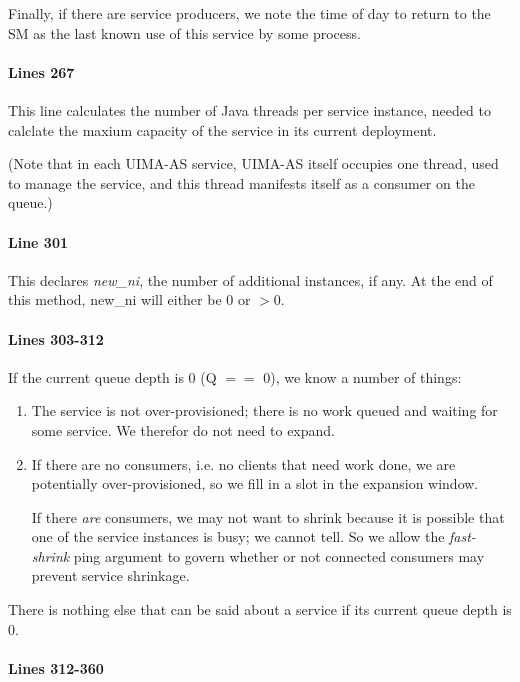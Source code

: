     Finally, if there are service producers, we note the time of day to
    return to the SM as the last known use of this service by some process.

    \paragraph{Lines 267}
    This line calculates the number of Java threads per service instance, needed to calclate the
    maxium capacity of the service in its current deployment.

    (Note that in each UIMA-AS service, UIMA-AS itself occupies one thread, used to
    manage the service, and this thread manifests itself as a consumer
    on the queue.)

    \paragraph{Line 301}
    This declares {\em new\_ni}, the number of additional instances, if any.
    At the end of this method, new\_ni will either be 0 or $>$0.

    \paragraph{Lines 303-312}
    If the current queue depth is 0 (Q $==$ 0), we know a number of things:
    \begin{enumerate}
      \item The service is not over-provisioned; there is no work queued and
        waiting for some service.  We therefor do not need to expand.
      \item If there are no consumers, i.e. no clients that need work done,
        we are potentially over-provisioned, so we fill in a slot in the
        expansion window.  
        
        If there {\em are} consumers, we may not want to
        shrink because it is possible that one of the service instances is
        busy; we cannot tell.  So we allow the {\em fast-shrink} 
        ping argument to govern whether or not connected consumers may
        prevent service shrinkage.
    \end{enumerate}

    There is nothing else that can be said about a service if its 
    current queue depth is 0.

    \paragraph{Lines 312-360}

